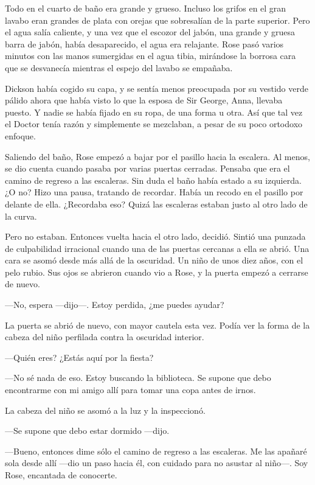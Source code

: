 \mbox{}

{Todo en el cuarto de baño era grande y grueso. Incluso los grifos en el
gran lavabo eran grandes de plata con orejas que sobresalían de la parte
superior. Pero el agua salía caliente, y una vez que el escozor del
jabón, una grande y gruesa barra de jabón, había desaparecido, el agua
era relajante. Rose pasó varios minutos con las manos sumergidas en el
agua tibia, mirándose la borrosa cara que se desvanecía mientras el
espejo del lavabo se empañaba.}

{Dickson había cogido su capa, y se sentía menos preocupada por su
vestido verde pálido ahora que había visto lo que la esposa de Sir
George, Anna, llevaba puesto. Y nadie se había fijado en su ropa, de una
forma u otra. Así que tal vez el Doctor tenía razón y simplemente se
mezclaban, a pesar de su poco ortodoxo enfoque.}

{Saliendo del baño, Rose empezó a bajar por el pasillo hacia la
escalera. Al menos, se dio cuenta cuando pasaba por varias puertas
cerradas. Pensaba que era el camino de regreso a las escaleras. Sin duda
el baño había estado a su izquierda. ¿O no? Hizo una pausa, tratando de
recordar. Había un recodo en el pasillo por delante de ella. ¿Recordaba
eso? Quizá las escaleras estaban justo al otro lado de la curva.}

{Pero no estaban. Entonces vuelta hacia el otro lado, decidió. Sintió
una punzada de culpabilidad irracional cuando una de las puertas
cercanas a ella se abrió. Una cara se asomó desde más allá de la
oscuridad. Un niño de unos diez años, con el pelo rubio. Sus ojos se
abrieron cuando vio a Rose, y la puerta empezó a cerrarse de nuevo.}

{---No, espera ---dijo---. Estoy perdida, ¿me puedes ayudar?}

{La puerta se abrió de nuevo, con mayor cautela esta vez. Podía ver la
forma de la cabeza del niño perfilada contra la oscuridad interior.}

{---Quién eres? ¿Estás aquí por la fiesta?}

{---No sé nada de eso. Estoy buscando la biblioteca. Se supone que debo
encontrarme con mi amigo allí para tomar una copa antes de irnos.}

{La cabeza del niño se asomó a la luz y la inspeccionó.}

{---Se supone que debo estar dormido ---dijo.}

{---Bueno, entonces dime sólo el camino de regreso a las escaleras. Me
las apañaré sola desde allí ---dio un paso hacia él, con cuidado para no
asustar al niño---. Soy Rose, encantada de conocerte.}

